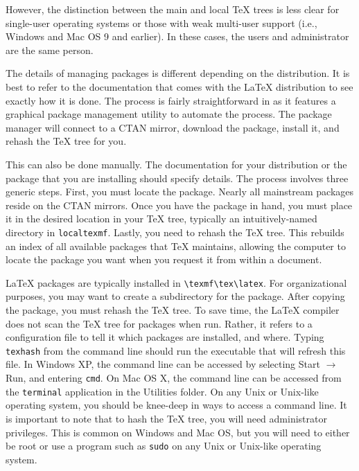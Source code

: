 However, the distinction between the main and local \TeX{} trees
is less clear for single-user operating systems or those with weak
multi-user support (i.e., Windows and Mac OS 9 and earlier).  In these
cases, the users and administrator are the same person.

The details of managing packages is different depending on the
distribution.  It is best to refer to the documentation that comes
with the \LaTeX{} distribution to see exactly how it is done.  The
process is fairly straightforward in \MiKTeX{} as it features a
graphical package management utility to automate the process.  The
package manager will connect to a CTAN mirror, download the package,
install it, and rehash the \TeX{} tree for you.

This can also be done manually.  The documentation for your
distribution or the package that you are installing should specify
details.  The process involves three generic steps.  First, you must
locate the package.  Nearly all mainstream packages reside on the CTAN
mirrors.  Once you have the package in hand, you must place it in the
desired location in your \TeX{} tree, typically an intuitively-named
directory in \texttt{localtexmf}.  Lastly, you need to rehash the
\TeX{} tree.  This rebuilds an index of all available packages that
\TeX{} maintains, allowing the computer to locate the package you want
when you request it from within a document.

\LaTeX{} packages are typically installed in \verb|\texmf\tex\latex|.
For organizational purposes, you may want to create a subdirectory for
the package.  After copying the package, you must rehash the \TeX{}
tree.  To save time, the \LaTeX{} compiler does not scan the \TeX{}
tree for packages when run.  Rather, it refers to a configuration file
to tell it which packages are installed, and where.  Typing
\texttt{texhash} from the command line should run the executable that
will refresh this file.  In Windows XP, the command line can be
accessed by selecting Start $\rightarrow$ Run, and entering
\texttt{cmd}.  On Mac OS X, the command line can be accessed from the
\texttt{terminal} application in the Utilities folder.  On any Unix or
Unix-like operating system, you should be knee-deep in ways to access
a command line.  It is important to note that to hash the \TeX{} tree,
you will need administrator privileges.  This is common on Windows and
Mac OS, but you will need to either be root or use a program such as
\texttt{sudo} on any Unix or Unix-like operating system.

